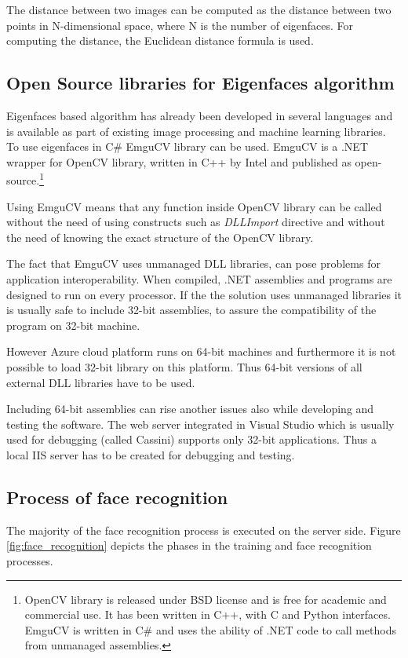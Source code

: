 The distance between two images can be computed as the distance between two points in N-dimensional space, where N is the number of eigenfaces. For computing the distance, the Euclidean distance formula is used.

\subsection{Open Source libraries for Eigenfaces algorithm}
Eigenfaces based algorithm has already been developed in several languages and is available as part of existing image processing and machine learning libraries. To use eigenfaces in C\# EmguCV library can be used. EmguCV is a .NET wrapper for OpenCV library, written in C++ by Intel and published as open-source.\footnote{OpenCV library is released under BSD license and is free for academic and commercial use. It has been written in C++, with C and Python interfaces. EmguCV is written in C\# and uses the ability of .NET code to call methods from unmanaged assemblies.}

Using EmguCV means that any function inside OpenCV library can be called without the need of using constructs such as \textit{DLLImport} directive and without the need of knowing the exact structure of the OpenCV library.

The fact that EmguCV uses unmanaged DLL libraries, can pose problems for application interoperability. When compiled, .NET assemblies and programs are designed to run on every processor. If the the solution uses unmanaged libraries it is usually safe to include 32-bit assemblies, to assure the compatibility of the program on 32-bit machine.

However Azure cloud platform runs on 64-bit machines and furthermore it is not possible to load 32-bit library on this platform. Thus 64-bit versions of all external DLL libraries have to be used.

Including 64-bit assemblies can rise another issues also while developing and testing the software. The web server integrated in Visual Studio which is usually used for debugging (called Cassini) supports only 32-bit applications. Thus a local IIS server has to be created for debugging and testing.

\subsection{Process of face recognition}
The majority of the face recognition process is executed on the server side. Figure \ref{fig:face_recognition} depicts the phases in the training and face recognition processes.


